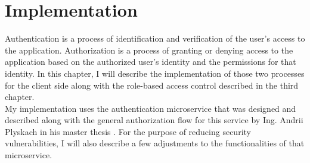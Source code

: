 \chapter{Implementation}
Authentication is a process of identification and verification of the user's access to the application. Authorization is a process of granting or denying access to the application based on the authorized user's identity and the permissions for that identity. \cite{auth-def} In this chapter, I will describe the implementation of those two processes for the client side along with the role-based access control described in the third chapter.\\
My implementation uses the authentication microservice that was designed and described along with the general authorization flow for this service by Ing. Andrii Plyskach in his master thesis \cite{mt-plyskach}. For the purpose of reducing security vulnerabilities, I will also describe a few adjustments to the functionalities of that microservice.

















